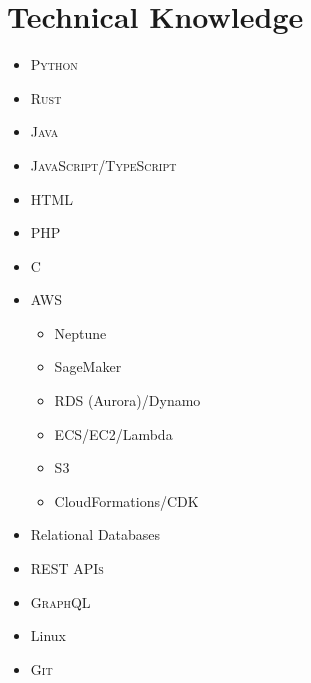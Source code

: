 \documentclass[letterpaper,10pt]{article}
\begin{document}
\pagestyle{plain}
\thispagestyle{fancy}


\section{Technical Knowledge}
\begin{minipage}[t]{0.3\textwidth}
	\begin{itemize}
		\item \textsc{Python}
		\item \textsc{Rust}
		\item \textsc{Java}
		\item \textsc{JavaScript/TypeScript}
		\item \textsc{HTML}
		\item \textsc{PHP}
		\item \textsc{C}
	\end{itemize}
\end{minipage}
\begin{minipage}[t]{0.3\textwidth}
	\begin{itemize}
		\item AWS
		      \begin{itemize}
			      \item Neptune
			      \item SageMaker
			      \item RDS (Aurora)/Dynamo
			      \item ECS/EC2/Lambda
			      \item S3
			      \item CloudFormations/CDK
		      \end{itemize}
	\end{itemize}
\end{minipage}
\begin{minipage}[t]{0.3\textwidth}
	\begin{itemize}
		\item Relational Databases
		\item \textsc{REST APIs}
		\item \textsc{GraphQL}
		\item Linux
		\item \textsc{Git}
	\end{itemize}
\end{minipage}\\

\end{document}
